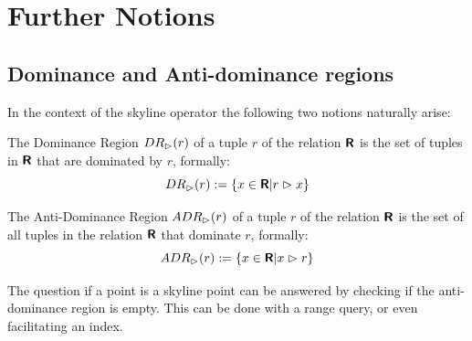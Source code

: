 %
%

\section{Further Notions}
\subsection{Dominance and Anti-dominance regions}
In the context of the skyline operator the following two notions naturally
arise:

\begin{definition}
The Dominance Region $DR_\vartriangleright(r)$ of a tuple $r$ of the relation
$\textnormal{\bf\textsf{R}}$ is the set of tuples in $\textnormal{\bf\textsf{R}}$ that are dominated
by $r$, formally:
\[
DR_\vartriangleright(r) := \{ x \in \textnormal{\bf\textsf{R}} | r \vartriangleright x \}
\]
\end{definition}

\begin{definition}
The Anti-Dominance Region $ADR_\vartriangleright(r)$ of a tuple $r$ of the
relation $\textnormal{\bf\textsf{R}}$ is the set of all tuples in the relation $\textnormal{\bf\textsf{R}}$
that dominate $r$, formally:
\[
ADR_\vartriangleright(r) := \{ x \in \textnormal{\bf\textsf{R}} | x \vartriangleright r \}
\]
\end{definition}

The question if a point is a skyline point can be answered by checking
if the anti-dominance region is empty.  This can be done with a range
query, or even facilitating an index.

